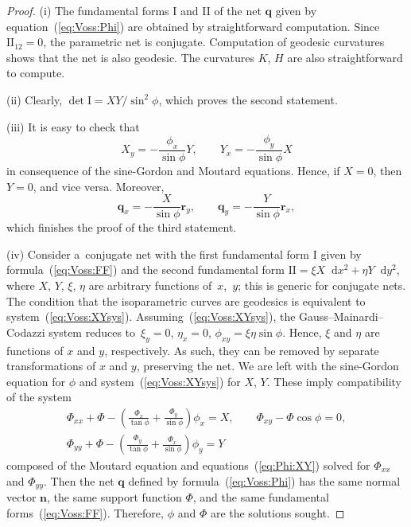 \documentclass[pdftex]{sigma}
\let\ve\mathbf
\def\eqref#1{{\rm(\ref{#1})}}
\def\dif{\mathop{}\!\mathrm d}
\numberwithin{equation}{section}
\theoremstyle{definition}
\begin{document}
\begin{proof}
(i) The fundamental forms I and II of the net $\ve q$ given
by equation~\eqref{eq:Voss:Phi} are obtained by straightforward computation.
Since $\mathrm{II}_{12} = 0$, the parametric net is conjugate.
Computation of geodesic curvatures shows that the net is also
geodesic. The curvatures $K$, $H$ are also straightforward to compute.

(ii) Clearly,
$\det\mathrm{I} = X Y/{\sin^2\phi}$,
which proves the second statement.

(iii) It is easy to check that
\begin{equation}
\label{eq:Voss:XYsys}
X_y = -\frac{\phi_x}{\sin\phi} Y,
\qquad
Y_x = -\frac{\phi_y}{\sin\phi} X
\end{equation}
in consequence of the sine-Gordon and Moutard equations.
Hence, if $X = 0$, then $Y = 0$, and vice versa.
Moreover,
\begin{equation}
\label{eq:Voss:Phi:TD}
\ve q_x = -\frac{X}{\sin\phi} \ve r_y,
\qquad
\ve q_y = -\frac{Y}{\sin\phi} \ve r_x,
\end{equation}
which finishes the proof of the third statement.

(iv)
Consider a~conjugate net with the first fundamental form I given by
formula~\eqref{eq:Voss:FF} and the second fundamental form
$\mathrm{II} = \xi X \dif x^2 + \eta Y \dif y^2$, where $X$, $Y$, $\xi$, $\eta$ are
arbitrary functions of~$x$,~$y$;
this is generic for conjugate nets.
The condition that the isoparametric curves are geodesics is
equivalent to system~\eqref{eq:Voss:XYsys}.
Assuming~\eqref{eq:Voss:XYsys}, the Gauss--Mainardi--Codazzi system
reduces to~${
\xi_{y} = 0}$,
$
\eta_{x} = 0$,
$
\phi_{xy} = \xi \eta \sin \phi$.
Hence, $\xi$ and $\eta$ are functions of $x$ and $y$, respectively.
As such, they can be removed by separate transformations of
$x$ and $y$, preserving the net.
We are left with the sine-Gordon equation for $\phi$ and
system~\eqref{eq:Voss:XYsys} for $X$, $Y$.
These imply compatibility of the system
\begin{gather*}
\Phi_{xx} + \Phi
 - \left(\frac{\Phi_x}{\tan\phi} + \frac{\Phi_y}{\sin\phi}\right) \phi_x = X,
\qquad
\Phi_{xy} - \Phi \cos\phi = 0,
\\
\Phi_{yy} + \Phi
 - \left(\frac{\Phi_y}{\tan\phi} + \frac{\Phi_x}{\sin \phi}\right) \phi_y = Y
\end{gather*}
composed of the Moutard equation and equations~\eqref{eq:Phi:XY}
solved for $\Phi_{xx}$ and $\Phi_{yy}$.
Then the net $\ve q$ defined by formula~\eqref{eq:Voss:Phi} has the
same normal vector $\ve n$, the same support function $\Phi$, and
the same fundamental forms~\eqref{eq:Voss:FF}.
Therefore, $\phi$ and $\Phi$ are the solutions sought.
\end{proof}
\end{document}
